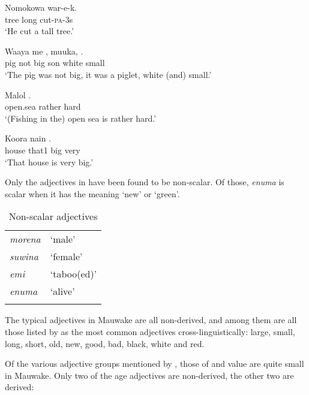 \ea%
\label{ex:3:x70}
\gll Nomokowa  war-e-k. \\
tree long cut-\textsc{pa}-3s\\
\glt`He cut a tall tree.'
\z

\ea%
\label{ex:3:x71}
\gll Waaya me , muuka,  . \\
pig not big son white small\\
\glt`The pig was not big, it was a piglet, white (and) small.'
\z

\ea%
\label{ex:3:x72}
\gll Malol  . \\
open.sea rather hard\\
\glt`(Fishing in the) open sea is rather hard.'
\z

\ea%
\label{ex:3:x73}
\gll Koora nain  . \\
house that1 big very\\
\glt`That house is very big.'
\z

Only the adjectives in  have been found to be non-scalar. Of those, \textit{enuma} is scalar when it has the meaning `new' or `green'.

\begin{table}
\caption{Non-scalar adjectives}
\label {tab:3:nonscalar}

\begin{tabular}{>{\itshape}ll}
\mytoprule
morena &`male'\\
suwina &`female'\\
emi &`taboo(ed)'\\
enuma &`alive'\\
\mybottomrule
\end{tabular}
\end{table}

The typical adjectives in Mauwake are all non-derived, and among them are all those listed by \citet[23]{Dixon1977} as the most common adjectives cross-linguistically: large, small, long, short, old, new, good, bad, black, white and red.

Of the various adjective groups mentioned by \citet{Dixon1977}, those of   and value are quite small in Mauwake. Only two of the age adjectives are non-derived, the other two are derived:

